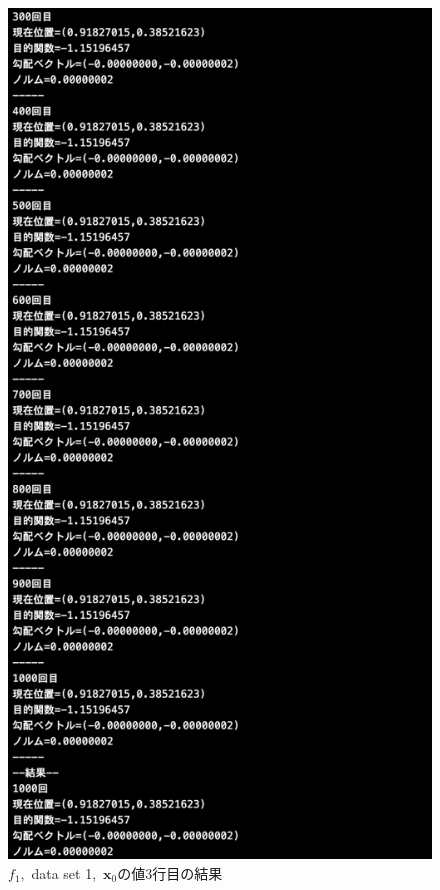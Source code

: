 \documentclass[12pt]{jarticle}
\begin{document}
\begin{figure}[h]
\begin{minipage}{0.5\hsize}
        \begin{center}
            \includegraphics[scale=0.2]{kadai1_1s_out1_3_3.png}
        \end{center}
    \end{minipage}
    \caption{$f_1$,\ data set 1,\ $\boldsymbol{x}_0$の値3行目の結果}
\end{figure}
\end{document}
